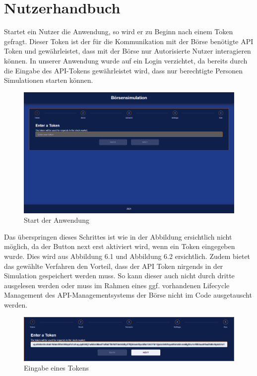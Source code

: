 \chapter{Nutzerhandbuch}\label{cha:Nutzerhandbuch}

Startet ein Nutzer die Anwendung, so wird er zu Beginn nach einem Token gefragt. Dieser Token ist der für die Kommunikation mit der Börse benötigte API Token und gewährleistet, dass mit der Börse nur Autorisierte Nutzer interagieren können. In unserer Anwendung wurde auf ein Login verzichtet, da bereits durch die Eingabe des API-Tokens gewährleistet wird, dass nur berechtigte Personen Simulationen starten können. 
\begin{figure}[ht]
	\includegraphics[width=\textwidth]{img/Token.png}
	\centering
	\caption{Start der Anwendung}
	\label{fig:token}
\end{figure}

Das überspringen dieses Schrittes ist wie in der Abbildung ersichtlich nicht möglich, da der Button next erst aktiviert wird, wenn ein Token eingegeben wurde. Dies wird aus Abbildung 6.1 und Abbildung 6.2 ersichtlich. Zudem bietet das gewählte Verfahren den Vorteil, dass der API Token nirgends in der Simulation gespeichert werden muss. So kann dieser auch nicht durch dritte ausgelesen werden oder muss im Rahmen eines ggf. vorhandenen Lifecycle Management des API-Managementsystems der Börse nicht im Code ausgetauscht werden. 
\begin{figure}[ht]
	\includegraphics[width=\textwidth]{img/TokenInput.png}
	\centering
	\caption{Eingabe eines Tokens}
	\label{fig:tokeninput}
\end{figure}


